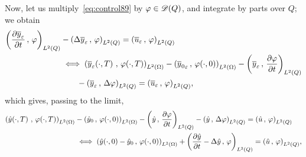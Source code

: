 Now, let us multiply~\eqref{eq:control89} by $\varphi\in\mathscr{D}(Q)$, and
integrate by parts over $Q$; we obtain
\begin{equation*}
    \begin{split}
        \scalaireq{\primetemps{\bareps{y}}}{\vphi} &- \scalaireq{%
            \Delta\bareps{y}
        }{%
            \vphi%
        } = \scalaireq{\bareps{u}}{\vphi}\\
        &\iff \scalaireohm{%
            \condfinale{\bareps{y}}
        }{%
            \condfinale{\vphi}
        } - \scalaireohm{%
            {\bar{y}_{0}}_{\veps}
        }{%
            \condinitiale{\vphi}
        } - \scalaireq{%
            \bareps{y}
        }{%
            \primetemps{\vphi}
        }\\
        &\qquad - \scalaireq{%
            \bareps{y}
        }{%
            \Delta\vphi%
        } = \scalaireq{\bareps{u}}{\vphi},
    \end{split}
\end{equation*}
which gives, passing to the limit,
\begin{equation*}
    \begin{split}
        \scalaireohm{%
            \condfinale{\hat{y}}
        }{%
            \condfinale{\vphi}
        } & - \scalaireohm{%
            {\hat{y}}_{0}
        }{%
            \condinitiale{\vphi}
        } - \scalaireq{%
            \hat{y}
        }{%
            \primetemps{\vphi}
        } - \scalaireq{%
            \hat{y}
        }{%
            \Delta\vphi%
        } = \scalaireq{\hat{u}}{\vphi}\\
        &\iff \scalaireohm{%
            \condinitiale{\hat{y}} - {\hat{y}}_{0}
        }{%
            \condinitiale{\vphi}
        } + \scalaireq{%
            \primetemps{\hat{y}} - \Delta\hat{y}
        }{%
            \vphi%
        } = \scalaireq{\hat{u}}{\vphi},
    \end{split}
\end{equation*}
